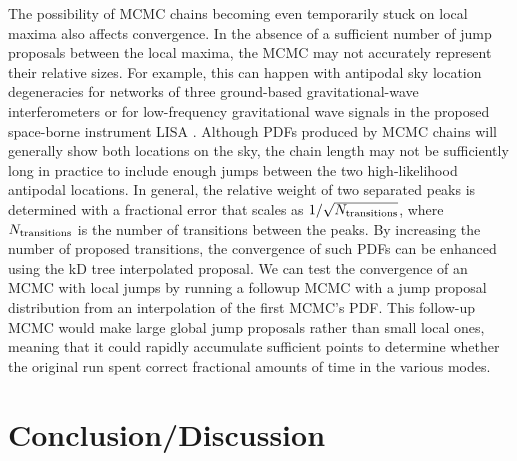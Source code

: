 \documentclass[prd,preprint]{revtex4}
\begin{document}
The possibility of MCMC chains becoming even temporarily stuck on
local maxima also affects convergence.  In the absence of a sufficient
number of jump proposals between the local maxima, the MCMC may not
accurately represent their relative sizes.  For example, this can
happen with antipodal sky location degeneracies for networks of three
ground-based gravitational-wave interferometers or for low-frequency
gravitational wave signals in the proposed space-borne instrument LISA
\cite{LISA}.  Although PDFs produced by MCMC chains will generally
show both locations on the sky, the chain length may not be
sufficiently long in practice to include enough jumps between the two
high-likelihood antipodal locations.  In general, the relative weight
of two separated peaks is determined with a fractional error that
scales as $1/\sqrt{N_{\textnormal{transitions}}}$, where
$N_{\textnormal{transitions}}$ is the number of transitions between
the peaks.  By increasing the number of proposed transitions, the
convergence of such PDFs can be enhanced using the kD tree
interpolated proposal.  We can test the convergence of an MCMC with
local jumps by running a followup MCMC with a jump proposal
distribution from an interpolation of the first MCMC's PDF.  This
follow-up MCMC would make large global jump proposals rather than
small local ones, meaning that it could rapidly accumulate sufficient
points to determine whether the original run spent correct fractional
amounts of time in the various modes.

\section{Conclusion/Discussion}





\nocite{Littenberg2009}


\end{document}
